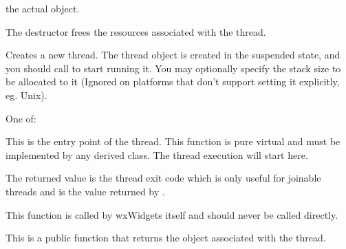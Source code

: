 
the actual  object.

\label{wxthreadhelperdtor}


The destructor frees the resources associated with the thread.

\label{wxthreadhelpercreate}


Creates a new thread. The thread object is created in the suspended state, and you
should call  to start running
it.  You may optionally specify the stack size to be allocated to it (Ignored on
platforms that don't support setting it explicitly, eg. Unix).


One of:

\twocolwidtha{7cm}
\begin{twocollist}\itemsep=0pt
\end{twocollist}

\label{wxthreadhelperentry}


This is the entry point of the thread. This function is pure virtual and must
be implemented by any derived class. The thread execution will start here.

The returned value is the thread exit code which is only useful for
joinable threads and is the value returned by
.

This function is called by wxWidgets itself and should never be called
directly.

\label{wxthreadhelpergetthread}


This is a public function that returns the  object
associated with the thread.

